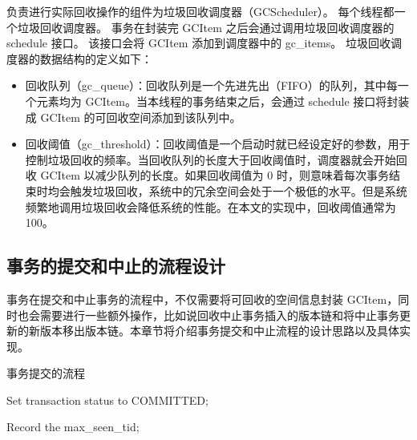 负责进行实际回收操作的组件为垃圾回收调度器（GCScheduler）。
每个线程都一个垃圾回收调度器。
事务在封装完 GCItem 之后会通过调用垃圾回收调度器的 schedule 接口。
该接口会将 GCItem 添加到调度器中的 gc\_items。
垃圾回收调度器的数据结构的定义如下：
\begin{itemize}
    \item 回收队列（gc\_queue）：回收队列是一个先进先出（FIFO）的队列，其中每一个元素均为 GCItem。当本线程的事务结束之后，会通过 schedule 接口将封装成 GCItem 的可回收空间添加到该队列中。
    \item 回收阈值（gc\_threshold）：回收阈值是一个启动时就已经设定好的参数，用于控制垃圾回收的频率。当回收队列的长度大于回收阈值时，调度器就会开始回收 GCItem 以减少队列的长度。如果回收阈值为 0 时，则意味着每次事务结束时均会触发垃圾回收，系统中的冗余空间会处于一个极低的水平。但是系统频繁地调用垃圾回收会降低系统的性能。在本文的实现中，回收阈值通常为 100。
\end{itemize}



\subsection{事务的提交和中止的流程设计}
\label{ssec:commit-abort}

事务在提交和中止事务的流程中，不仅需要将可回收的空间信息封装 GCItem，同时也会需要进行一些额外操作，比如说回收中止事务插入的版本链和将中止事务更新的新版本移出版本链。本章节将介绍事务提交和中止流程的设计思路以及具体实现。

\begin{algorithm}[h]
    \caption{事务提交的流程}
    \label{alg:commit}
    \BlankLine
    Set transaction status to COMMITTED;



    Record the max\_seen\_tid;



\end{algorithm}

